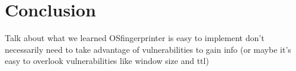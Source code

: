 \section{Conclusion}
Talk about what we learned
OSfingerprinter is easy to implement
don't necessarily need to take advantage of vulnerabilities to gain info (or maybe it's easy to overlook vulnerabilities like window size and ttl)
